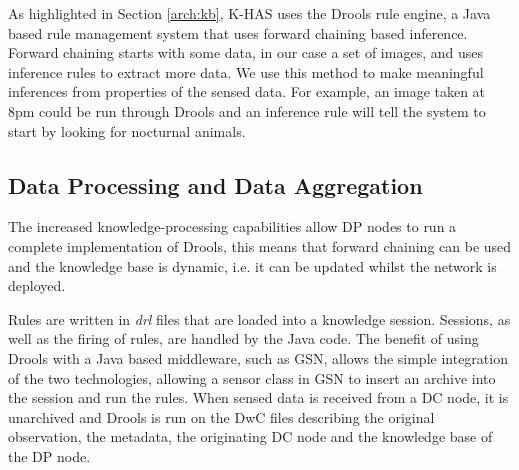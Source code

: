 		As highlighted in Section \ref{arch:kb}, K-HAS uses the Drools rule engine, a Java based rule management system that uses forward chaining based inference. Forward chaining starts with some data, in our case a set of images, and uses inference rules to extract more data. We use this method to make meaningful inferences from properties of the sensed data. For example, an image taken at 8pm could be run through Drools and an inference rule will tell the system to start by looking for nocturnal animals.
		
		
	
	\subsection{Data Processing and Data Aggregation}
		The increased knowledge-processing capabilities allow DP nodes to run a complete implementation of Drools, this means that forward chaining can be used and the knowledge base is dynamic, i.e. it can be updated whilst the network is deployed. 
		
		Rules are written in \textit{drl} files that are loaded into a knowledge session. Sessions, as well as the firing of rules, are handled by the Java code. The benefit of using Drools with a Java based middleware, such as GSN, allows the simple integration of the two technologies, allowing a sensor class in GSN to insert an archive into the session and run the rules. When sensed data is received from a DC node, it is unarchived and Drools is run on the DwC files describing the original observation, the metadata, the originating DC node and the knowledge base of the DP node.
		
